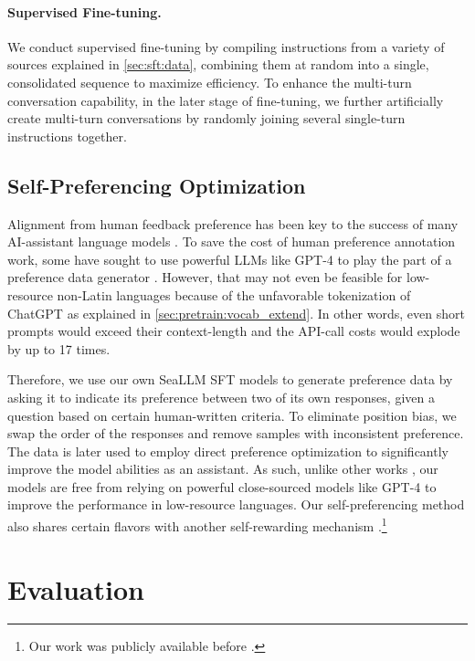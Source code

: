 \paragraph{Supervised Fine-tuning.} We conduct supervised fine-tuning by compiling instructions from a variety of sources explained in \ref{sec:sft:data}, combining them at random into a single, consolidated sequence to maximize efficiency. To enhance the multi-turn conversation capability, in the later stage of fine-tuning, we further artificially create multi-turn conversations by randomly joining several single-turn instructions together. 

\subsection{Self-Preferencing Optimization}\label{sec:dpo}

Alignment from human feedback preference has been key to the success of many AI-assistant language models \citep{rlhf_stiennon2020learning,llama2touvron2023llama,dpo_rafailov2023direct,instructgpt_ouyang2022training}. To save the cost of human preference annotation work, some have sought to use powerful LLMs like GPT-4 \citep{gpt4} to play the part of a preference data generator \citep{zephyr7b_tunstall2023}. However, that may not even be feasible for low-resource non-Latin languages because of the unfavorable tokenization of ChatGPT as explained in \ref{sec:pretrain:vocab_extend}. In other words, even short prompts would exceed their context-length and the API-call costs would explode by up to 17 times.

Therefore, we use our own SeaLLM SFT models to generate preference data by asking it to indicate its preference between two of its own responses, given a question based on certain human-written criteria. To eliminate position bias, we swap the order of the responses and remove samples with inconsistent preference. The data is later used to employ direct preference optimization \citep{dpo_rafailov2023direct} to significantly improve the model abilities as an assistant. As such, unlike other works \citep{orca_mukherjee2023orca,zephyr7b_tunstall2023}, our models are free from relying on powerful close-sourced models like GPT-4 to improve the performance in low-resource languages. Our self-preferencing method also shares certain flavors with another self-rewarding mechanism \citep{yuan2024self_reward_lm}.\footnote{Our work was publicly available before \citet{yuan2024self_reward_lm}.}

\section{Evaluation}\label{sec:eval}

